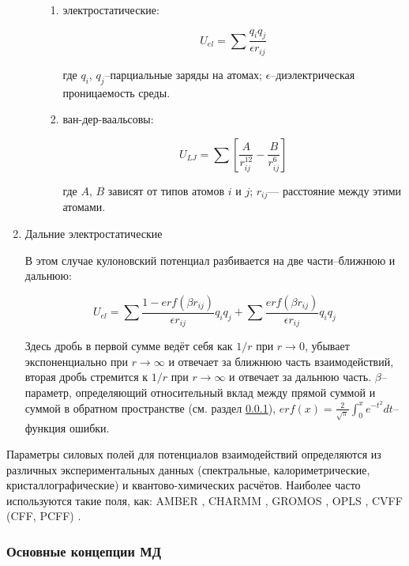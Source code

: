 \begin{enumerate}
\begin{enumerate}
		\begin{enumerate}
	
		\item электростатические:
		
		\[
		U_{el} = \sum \frac{q_{i} q_{j}}{\epsilon r_{ij}}
		\]

		где $q_i$, $q_j$--парциальные заряды на атомах; $\epsilon$--диэлектрическая проницаемость среды.
		
		\item  ван-дер-ваальсовы:
		
		\[
		U_{LJ} = \sum{\left [ \frac{A}{r_{ij}^{12}}-\frac{B}{r_{ij}^{6}} \right ]}
		\]
		
		где $A$, $B$ зависят от типов атомов $i$ и $j$; $r_{ij}$— расстояние между этими атомами.

		\end{enumerate}

	\end{enumerate}

\item  Дальние электростатические

В этом случае кулоновский потенциал разбивается на две части--ближнюю и дальнюю:

\[
U_{el} = \sum { \frac{1 - erf(\beta r_{ij})}{\epsilon r_{ij}}} q_i q_j + \sum {\frac{erf(\beta r_{ij})}{\epsilon r_{ij}}} q_i q_j
\]

Здесь дробь в первой сумме ведёт себя как $1/r$ при $r \to 0$, убывает экспоненциально при $r \to \infty $ и отвечает за ближнюю часть взаимодействий, вторая дробь стремится к $1/r$ при $r \to \infty $ и отвечает за дальнюю часть. $\beta$--параметр, определяющий относительный вклад между прямой суммой и суммой в обратном пространстве (см. раздел \ref{subsubsect_methods_MD_concepts}), $erf(x) = \frac {2}{\sqrt{\pi}} \int_0^x{e^{-t^2} dt}$--функция ошибки.

\end{enumerate}

Параметры силовых полей для потенциалов взаимодействий определяются из различных экспериментальных данных (спектральные, калориметрические, кристаллографические) и квантово-химических расчётов. Наиболее часто используются такие поля, как: AMBER \cite{Cornell1995,Kollman1996,Wang2000,Hornak2006,LindorffLarsen2010,Duan2003,Garcia2002}, CHARMM \cite{Mackerell2004,Mackerell1998,Feller2000,Foloppe2004}, GROMOS \cite{Gunsteren1996}, OPLS \cite{Jorgensen1996}, CVFF (CFF, PCFF) \cite{Hagler1974}.

\subsubsection{Основные концепции МД} \label{subsubsect_methods_MD_concepts}

